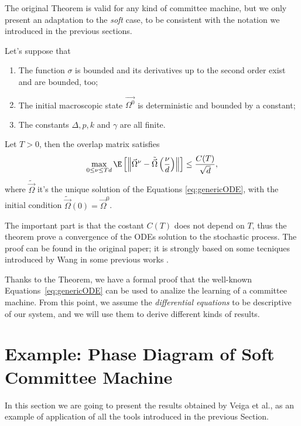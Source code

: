 The original Theorem is valid for any kind of committee machine, but we only present
an adaptation to the \emph{soft} case, to be consistent with the notation
we introduced in the previous sections.
\begin{theorem}\label{thm:process_to_ode_goldt}
  Let's suppose that
  \begin{enumerate}
    \item The function \(\sigma\) is bounded and its derivatives up to the second order exist and are bounded, too;
    \item The initial macroscopic state \(\vec{\Omega^0}\) is deterministic and bounded by a constant;
    \item The constants \(\Delta, p, k\) and \(\gamma\) are all finite.
  \end{enumerate}
  Let \(T>0\), then the overlap matrix satisfies 
  \begin{equation}
    \max_{0\le\nu\le Td} \E\left[
      \left\|\vec{\Omega}^\nu - \tilde{\vec{\Omega}}\left(\frac{\nu}{d}\right)\right\|
    \right]
    \le
    \frac{C{(T)}}{\sqrt{d}},
  \end{equation}
  where \(\tilde{\vec{\Omega}}\) it's the unique solution of the Equations \eqref{eq:genericODE},
  with the initial condition \(\tilde{\vec{\Omega}}{(0)} = \vec{\Omega}^0\). 
\end{theorem}
The important part is that the costant \(C{(T)}\) does not depend on \(T\), thus 
the theorem prove a convergence of the ODEs solution to the stochastic process.
The proof can be found in the original paper\cite{goldt2019dynamics};
it is strongly based on some tecniques introduced by Wang in some previous works
\cite{wang2017scaling,wang2019solvable}.

Thanks to the Theorem, we have a formal proof that the well-known Equations~\eqref{eq:genericODE}
can be used to analize the learning of a committee machine. From this point,
we assume the \emph{differential equations} to be descriptive of our system,
and we will use them to derive different kinds of results.




\section{Example: Phase Diagram of Soft Committee Machine}
In this section we are going to present the results obtained by Veiga et al.\cite{veiga2022phase},
as an example of application of all the tools introduced in the previous Section.
